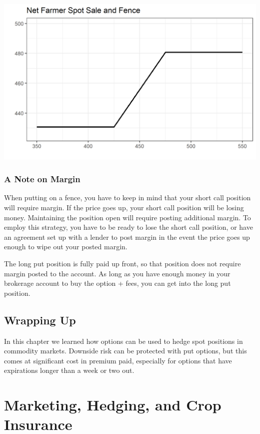 \documentclass[
  letterpaper,
  DIV=11,
  numbers=noendperiod]{scrreprt}
\begin{document}
\includegraphics{assets/Options4-Netspotfence.png}

\subsection{A Note on Margin}\label{a-note-on-margin}

When putting on a fence, you have to keep in mind that your short call
position will require margin. If the price goes up, your short call
position will be losing money. Maintaining the position open will
require posting additional margin. To employ this strategy, you have to
be ready to lose the short call position, or have an agreement set up
with a lender to post margin in the event the price goes up enough to
wipe out your posted margin.

The long put position is fully paid up front, so that position does not
require margin posted to the account. As long as you have enough money
in your brokerage account to buy the option + fees, you can get into the
long put position.

\section{Wrapping Up}\label{wrapping-up}

In this chapter we learned how options can be used to hedge spot
positions in commodity markets. Downside risk can be protected with put
options, but this comes at significant cost in premium paid, especially
for options that have expirations longer than a week or two out.


\chapter{Marketing, Hedging, and Crop
Insurance}\label{marketing-hedging-and-crop-insurance}
\end{document}
